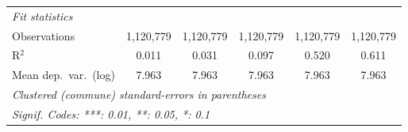 \begin{tabular}{lccccc}
   \midrule
   \emph{Fit statistics}\\
   Observations                       & 1,120,779       & 1,120,779       & 1,120,779       & 1,120,779       & 1,120,779\\
   R$^2$                              & 0.011           & 0.031           & 0.097           & 0.520           & 0.611\\
   Mean dep.\ var.\ (log)             & 7.963           & 7.963           & 7.963           & 7.963           & 7.963\\
   \midrule \midrule
   \multicolumn{6}{l}{\emph{Clustered (commune) standard-errors in parentheses}}\\
   \multicolumn{6}{l}{\emph{Signif. Codes: ***: 0.01, **: 0.05, *: 0.1}}\\
\end{tabular}
\par\endgroup
